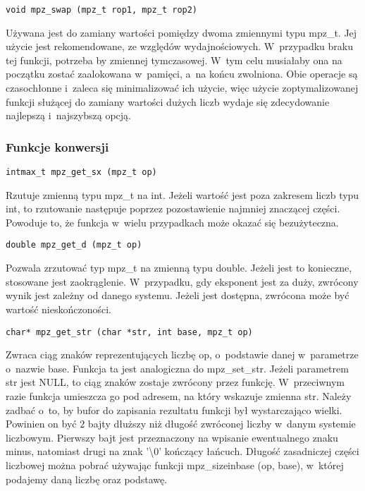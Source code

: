 \begin{lstlisting}
void mpz_swap (mpz_t rop1, mpz_t rop2)
\end{lstlisting}

Używana jest do zamiany wartości pomiędzy dwoma zmiennymi typu mpz\_t. Jej użycie jest rekomendowane, ze względów wydajnościowych. W~przypadku braku tej funkcji, potrzeba by zmiennej tymczasowej. W~tym celu musiałaby ona na początku zostać zaalokowana w~pamięci, a~na końcu zwolniona. Obie operacje są czasochłonne i~zaleca się minimalizować ich użycie, więc użycie zoptymalizowanej funkcji służącej do zamiany wartości dużych liczb wydaje się zdecydowanie najlepszą i~najszybszą opcją.

\subsubsection{Funkcje konwersji}

\begin{lstlisting}
intmax_t mpz_get_sx (mpz_t op)
\end{lstlisting}

Rzutuje zmienną typu mpz\_t na int. Jeżeli wartość jest poza zakresem liczb typu int, to rzutowanie następuje poprzez pozostawienie najmniej znaczącej części. Powoduje to, że funkcja w~wielu przypadkach może okazać się bezużyteczna.

\begin{lstlisting}
double mpz_get_d (mpz_t op)
\end{lstlisting}

Pozwala zrzutować typ mpz\_t na zmienną typu double. Jeżeli jest to konieczne, stosowane jest zaokrąglenie. W~przypadku, gdy eksponent jest za duży, zwrócony wynik jest zależny od danego systemu. Jeżeli jest dostępna, zwrócona może być wartość nieskończoności.

\begin{lstlisting}
char* mpz_get_str (char *str, int base, mpz_t op)
\end{lstlisting}

Zwraca ciąg znaków reprezentujących liczbę op, o~podstawie danej w~parametrze o~nazwie base. Funkcja ta jest analogiczna do mpz\_set\_str. Jeżeli parametrem str jest NULL, to ciąg znaków zostaje zwrócony przez funkcję. W~przeciwnym razie funkcja umieszcza go pod adresem, na który wskazuje zmienna str. Należy zadbać o~to, by bufor do zapisania rezultatu funkcji był wystarczająco wielki. Powinien on być $2$ bajty dłuższy niż długość zwróconej liczby w~danym systemie liczbowym. Pierwszy bajt jest przeznaczony na wpisanie ewentualnego znaku minus, natomiast drugi na znak '\textbackslash$0$' kończący łańcuch. Długość zasadniczej części liczbowej można pobrać używając funkcji mpz\_sizeinbase (op, base), w~której podajemy daną liczbę oraz podstawę.

